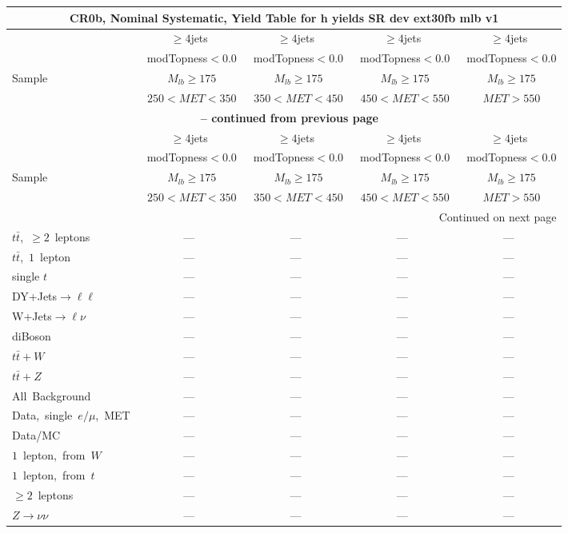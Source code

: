 \documentclass{article}
\begin{document}
\begin{longtable}{|l|c|c|c|c|} 
 
\multicolumn{5}{c}{ CR0b, Nominal Systematic, Yield Table for h yields SR dev ext30fb mlb v1 }\\* \hline 
  & $\ge4$jets  & $\ge4$jets  & $\ge4$jets  & $\ge4$jets \\* 
  & ~modTopness$<0.0$  & ~modTopness$<0.0$  & ~modTopness$<0.0$  & ~modTopness$<0.0$ \\* 
Sample  & ~$M_{lb}\ge175$  & ~$M_{lb}\ge175$  & ~$M_{lb}\ge175$  & ~$M_{lb}\ge175$ \\* 
  & ~$250<MET<350$  & ~$350<MET<450$  & ~$450<MET<550$  & ~$MET>550$ \\* 
\hline \hline 
\endfirsthead 
 
\multicolumn{5}{c}{{\bfseries \tablename\ \thetable{} -- continued from previous page}}\\* \hline 
  & $\ge4$jets  & $\ge4$jets  & $\ge4$jets  & $\ge4$jets \\* 
  & ~modTopness$<0.0$  & ~modTopness$<0.0$  & ~modTopness$<0.0$  & ~modTopness$<0.0$ \\* 
Sample  & ~$M_{lb}\ge175$  & ~$M_{lb}\ge175$  & ~$M_{lb}\ge175$  & ~$M_{lb}\ge175$ \\* 
  & ~$250<MET<350$  & ~$350<MET<450$  & ~$450<MET<550$  & ~$MET>550$ \\* 
\hline \hline 
\endhead 
 
\multicolumn{5}{|r|}{{Continued on next page}}\\* \hline 
\endfoot 
 
 
\endlastfoot 
 
$t\bar{t}$,~$\ge2$~leptons & ---  & ---  & ---  & --- \\* 
$t\bar{t}$,~$1$~lepton & ---  & ---  & ---  & --- \\* 
single $t$  & ---  & ---  & ---  & --- \\* 
DY+Jets$\rightarrow\ell\ell$  & ---  & ---  & ---  & --- \\* 
W+Jets$\rightarrow\ell\nu$  & ---  & ---  & ---  & --- \\* 
diBoson  & ---  & ---  & ---  & --- \\* 
$t\bar{t}+W$  & ---  & ---  & ---  & --- \\* 
$t\bar{t}+Z$  & ---  & ---  & ---  & --- \\* 
\hline \hline 
All~Background  & ---  & ---  & ---  & --- \\* 
Data,~single~$e/\mu$,~MET  & ---  & ---  & ---  & --- \\* 
Data/MC  & ---  & ---  & ---  & --- \\* 
\hline \hline 
$1$~lepton,~from~$W$  & ---  & ---  & ---  & --- \\* 
$1$~lepton,~from~$t$  & ---  & ---  & ---  & --- \\* 
$\ge2$~leptons  & ---  & ---  & ---  & --- \\* 
$Z\rightarrow\nu\nu$  & ---  & ---  & ---  & --- \\* 
\hline 
\end{longtable} 
\end{document}
